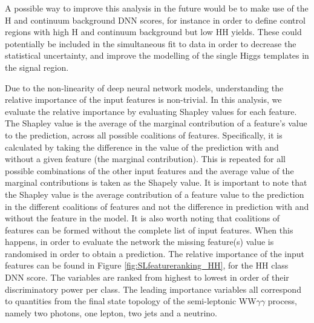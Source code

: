 A possible way to improve this analysis in the future would be to make use of the H and continuum background DNN scores, for instance in order to define control regions with high H and continuum background but low HH yields. These could potentially be included in the simultaneous fit to data in order to decrease the statistical uncertainty, and improve the modelling of the single Higgs templates in the signal region.  

Due to the non-linearity of deep neural network models, understanding the relative importance of the input features is non-trivial. In this analysis,
we evaluate the relative importance by evaluating Shapley values \cite{shapley_values} for each feature. The Shapley value is the average of the marginal
contribution of a feature's value to the prediction, across all possible coalitions of features. Specifically, it is calculated by taking the difference in the
value of the prediction with and without a given feature (the marginal contribution). This is repeated for all possible combinations of the other input features and
the average value of the marginal contributions is taken as the Shapely value. It is important to note that the Shapley value is the average contribution of a feature
value to the prediction in the different coalitions of features and not the difference in prediction with and without the feature in the model. 
It is also worth noting that coalitions of features can be formed without the complete list of input features. When this happens, in order to
evaluate the network the missing feature(s) value is randomised in order to obtain a prediction. The relative importance of the input features can be found in
Figure \ref{fig:SLfeatureranking_HH}, for the HH class DNN score. The variables are
ranked from highest to lowest in order of their discriminatory power per class. The leading importance variables all correspond to quantities from the final state topology of the semi-leptonic WW$\gamma\gamma$ process, namely two photons, one lepton, two jets and a neutrino.

